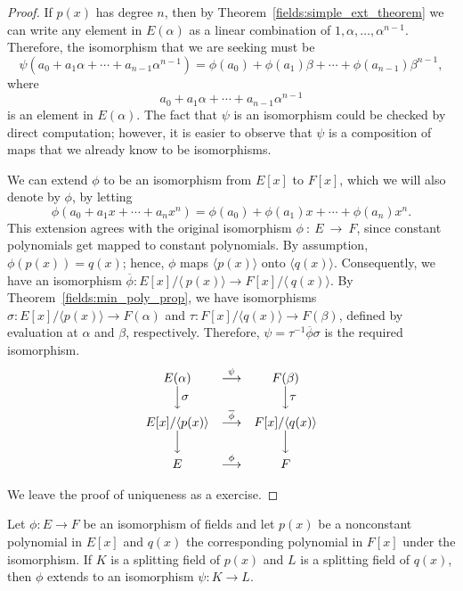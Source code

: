 \begin{proof}
If $p(x)$ has degree $n$, then by Theorem~\ref{fields:simple_ext_theorem} we can write any
element in $E( \alpha )$ as a linear combination of $1, \alpha,
\ldots, \alpha^{n-1}$. Therefore, the isomorphism that we are seeking
must be   
\[
\psi( a_0 + a_1 \alpha + \cdots + a_{n-1} \alpha^{n-1})
= \phi(a_0) + \phi(a_1) \beta + \cdots + \phi(a_{n-1}) \beta^{n-1}, 
\]
where 
\[
a_0 + a_1 \alpha + \cdots + a_{n-1} \alpha^{n-1}
\]
is an
element in $E(\alpha)$. The fact that $\psi$ is an isomorphism could
be checked by direct computation; however, it is easier to observe
that $\psi$ is a composition of maps that we already know to be 
isomorphisms.   

We can extend $\phi$ to be an isomorphism from $E[x]$ to $F[x]$, which
we will also denote by $\phi$, by letting
\[
\phi( a_0 + a_1 x + \cdots + a_n x^n )
= 
\phi( a_0 ) + \phi(a_1) x + \cdots + \phi(a_n) x^n.
\]
This extension agrees with the original isomorphism
$\phi~:~E~\rightarrow~F$, since constant polynomials get mapped to
constant polynomials.  By assumption, $\phi(p(x)) = q(x)$; hence,
$\phi$ maps $\langle p(x) \rangle$ onto $\langle q(x) \rangle$.
Consequently, we have an isomorphism
\mbox{$\overline{\phi} : E[x] / \langle~p(x) \rangle \rightarrow
F[x]/\langle~q(x) \rangle$}. By Theorem~\ref{fields:min_poly_prop}, we have 
isomorphisms
\mbox{$\sigma: E[x]/\langle p(x) \rangle \rightarrow F(\alpha)$} and
\mbox{$\tau : F[x]/\langle q(x) \rangle \rightarrow F( \beta )$},
defined by evaluation at $\alpha$ and $\beta$, respectively.
Therefore, $\psi = \tau^{-1} \overline{\phi} \sigma$ is the required
isomorphism.   
\[
\begin{array}{ccc}
E(\alpha) &
\stackrel{\psi}{\longrightarrow} & F(\beta) \\  
\Big\downarrow\vcenter{\rlap{$\sigma$}} & &
\Big\downarrow\vcenter{\rlap{$\tau$}} \\ 
E[x] / \langle p(x) \rangle & \stackrel{\overline{\phi}}{\longrightarrow} &
F[x]/\langle q(x) \rangle \\
\Big\downarrow & & \Big\downarrow \\
E & \stackrel{\phi}{\longrightarrow} & F
\end{array}
\]

We leave the proof of uniqueness as a exercise.
\end{proof}

 
\begin{theorem}
Let $\phi : E \rightarrow F$ be an isomorphism of fields and let 
$p(x)$ be a nonconstant polynomial in $E[x]$ and $q(x)$
the corresponding polynomial in $F[x]$ under the isomorphism. If $K$ is
a splitting field of $p(x)$ and $L$ is a splitting field of $q(x)$,
then $\phi$ extends to an isomorphism $\psi : K \rightarrow L$.
\end{theorem}


